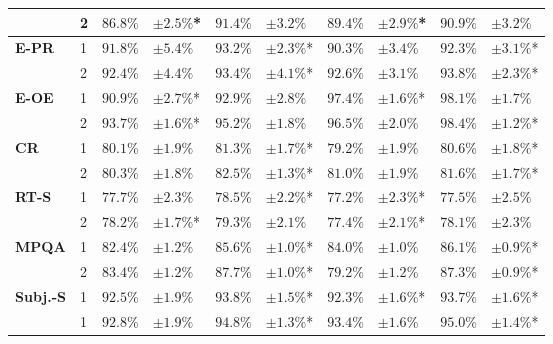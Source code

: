 \begin{table}
{\begin{tabular}{ll|ll|ll|ll|ll}
                 &2& $86.8\%$    & $\pm 2.5\%$*   & $91.4\%$     & $\pm 3.2\%$     & $89.4\%$    & $\pm 2.9\%$*   & $90.9\%$     & $\pm 3.2\%$     \\\hline
\textbf{E-PR}    &1& $91.8\%$    & $\pm 5.4\%$    & $93.2\%$     & $\pm 2.3\%$*    & $90.3\%$    & $\pm 3.4\%$    & $92.3\%$     & $\pm 3.1\%$*    \\
                 &2& $92.4\%$    & $\pm 4.4\%$    & $93.4\%$     & $\pm 4.1\%$*    & $92.6\%$    & $\pm 3.1\%$    & $93.8\%$     & $\pm 2.3\%$*    \\\hline
\textbf{E-OE}    &1& $90.9\%$    & $\pm 2.7\%$*   & $92.9\%$     & $\pm 2.8\%$     & $97.4\%$    & $\pm 1.6\%$*   & $98.1\%$     & $\pm 1.7\%$     \\
                 &2& $93.7\%$    & $\pm 1.6\%$*   & $95.2\%$     & $\pm 1.8\%$     & $96.5\%$    & $\pm 2.0\%$    & $98.4\%$     & $\pm 1.2\%$*    \\\hline\hline
\textbf{CR}      &1& $80.1\%$    & $\pm 1.9\%$    & $81.3\%$     & $\pm 1.7\%$*    & $79.2\%$    & $\pm 1.9\%$    & $80.6\%$     & $\pm 1.8\%$*    \\
                 &2& $80.3\%$    & $\pm 1.8\%$    & $82.5\%$     & $\pm 1.3\%$*    & $81.0\%$    & $\pm 1.9\%$    & $81.6\%$     & $\pm 1.7\%$*   \\\hline
\textbf{RT-S}    &1& $77.7\%$    & $\pm 2.3\%$    & $78.5\%$     & $\pm 2.2\%$*    & $77.2\%$    & $\pm 2.3\%$*   & $77.5\%$     & $\pm 2.5\%$     \\
                 &2& $78.2\%$    & $\pm 1.7\%$*   & $79.3\%$     & $\pm 2.1\%$     & $77.4\%$    & $\pm 2.1\%$*   & $78.1\%$     & $\pm 2.3\%$     \\\hline
\textbf{MPQA}    &1& $82.4\%$    & $\pm 1.2\%$    & $85.6\%$     & $\pm 1.0\%$*    & $84.0\%$    & $\pm 1.0\%$    & $86.1\%$     & $\pm 0.9\%$*    \\
                 &2& $83.4\%$    & $\pm 1.2\%$    & $87.7\%$     & $\pm 1.0\%$*    & $79.2\%$    & $\pm 1.2\%$    & $87.3\%$     & $\pm 0.9\%$*    \\\hline
\textbf{Subj.-S} &1& $92.5\%$    & $\pm 1.9\%$    & $93.8\%$     & $\pm 1.5\%$*    & $92.3\%$    & $\pm 1.6\%$*   & $93.7\%$     & $\pm 1.6\%$*    \\
                 &1& $92.8\%$    & $\pm 1.9\%$    & $94.8\%$     & $\pm 1.3\%$*    & $93.4\%$    & $\pm 1.6\%$    & $95.0\%$     & $\pm 1.4\%$*    \\\hline
\end{tabular}
}                                                                             

\end{table}
